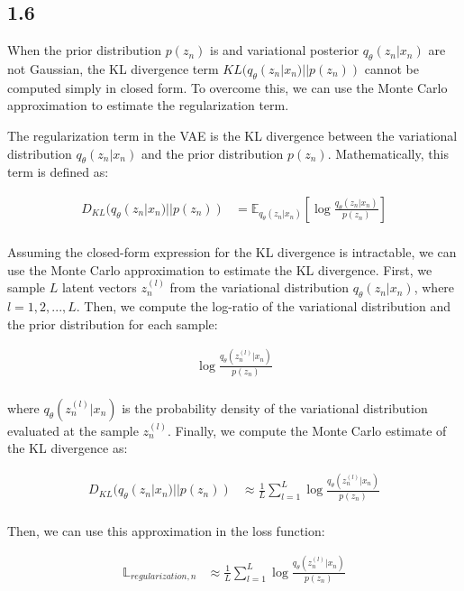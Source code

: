 \documentclass{article}
\begin{document}
\subsection*{1.6}

When the prior distribution $p(z_n)$ is and variational posterior $q_{\theta}(z_n|x_n)$ are not Gaussian, the KL divergence
term $KL(q_{\theta}(z_n|x_n) || p(z_n))$ cannot be computed simply in closed form. To overcome this, we can use the
Monte Carlo approximation to estimate the regularization term. 

The regularization term in the VAE is the KL divergence between the variational distribution $q_{\theta}(z_n|x_n)$ and the prior distribution $p(z_n)$.
Mathematically, this term is defined as:

\begin{align*}
    D_{KL}(q_{\theta}(z_n|x_n) || p(z_n)) &= \mathbb{E}_{q_{\theta}(z_n|x_n)}[\log \frac{q_{\theta}(z_n|x_n)}{p(z_n)}] \\
\end{align*}

Assuming the closed-form expression for the KL divergence is intractable, we can use the Monte Carlo approximation to estimate the KL divergence.
First, we sample $L$ latent vectors $z_n^{(l)}$ from the variational distribution $q_{\theta}(z_n|x_n)$, where $l = 1, 2, ..., L$.
Then, we compute the log-ratio of the variational distribution and the prior distribution for each sample:

\begin{align*}
    \log \frac{q_{\theta}(z_n^{(l)}|x_n)}{p(z_n)} \\
\end{align*}

where $q_{\theta}(z_n^{(l)}|x_n)$ is the probability density of the variational distribution evaluated at the sample $z_n^{(l)}$.
Finally, we compute the Monte Carlo estimate of the KL divergence as:

\begin{align*}
    D_{KL}(q_{\theta}(z_n|x_n) || p(z_n)) &\approx \frac{1}{L} \sum_{l=1}^{L} \log \frac{q_{\theta}(z_n^{(l)}|x_n)}{p(z_n)} \\
\end{align*}

Then, we can use this approximation in the loss function:

\begin{align*}
    \mathbb{L}_{regularization,n} &\approx \frac{1}{L} \sum_{l=1}^{L} \log \frac{q_{\theta}(z_n^{(l)}|x_n)}{p(z_n)} \\
\end{align*}
\end{document}
